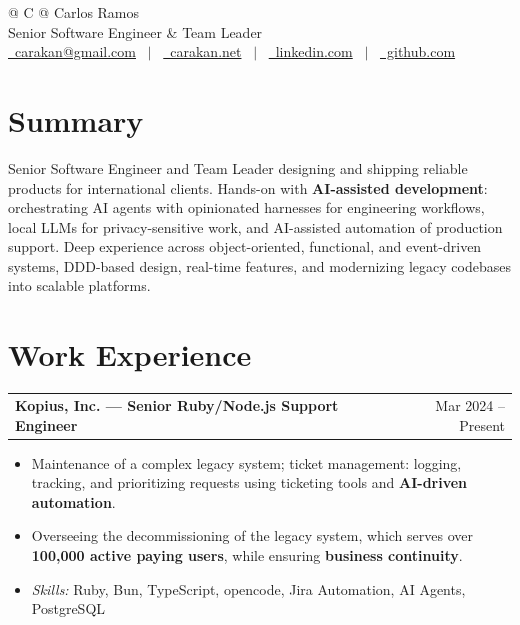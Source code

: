 \documentclass[a4paper,12pt]{article}
\makeatletter
\newcommand{\skillsfont}{\fontsize{9.6}{11.5}\selectfont}
\newenvironment{joblong}[2]
    {
    \begin{tabularx}{\linewidth}{@{}l X r@{}}
    \textbf{#1} & \hfill &  #2 \\[3.75pt]
    \end{tabularx}
    \begin{minipage}[t]{\linewidth}
    \begin{itemize}[nosep,after=\strut, leftmargin=1em, itemsep=3pt,label=--]
    }
    {
    \end{itemize}
    \end{minipage}
    }
\makeatother
\begin{document}
\pagestyle{empty}


\begin{tabularx}{\linewidth}{@{} C @{}}
\Huge{Carlos Ramos} \\[7.5pt]
\Large{Senior Software Engineer \& Team Leader} \\[7.5pt]
\href{mailto:carakan@gmail.com}{\raisebox{-0.05\height}\faEnvelope \ carakan@gmail.com} \ $|$ \
\href{https://carakan.net}{\raisebox{-0.05\height}\faGlobe \ carakan.net} \ $|$ \
\href{https://www.linkedin.com/in/carakan}{\raisebox{-0.05\height}\faLinkedin\ linkedin.com} \ $|$ \
\href{https://github.com/carakan}{\raisebox{-0.05\height}\faGithub\ github.com} \\
\end{tabularx}


\section{Summary}
Senior Software Engineer and Team Leader designing and shipping reliable
products for international clients. Hands-on with \textbf{AI-assisted
development}: orchestrating AI agents with opinionated harnesses for
engineering workflows, local LLMs for privacy-sensitive work, and AI-assisted
automation of production support.
Deep experience across object-oriented, functional, and event-driven systems,
DDD-based design, real-time features, and modernizing legacy codebases into
scalable platforms.

\section{Work Experience}

\begin{joblong}{Kopius, Inc. --- Senior Ruby/Node.js Support Engineer}{Mar 2024 -- Present}
\item Maintenance of a complex legacy system;
      ticket management: logging, tracking, and prioritizing requests using
      ticketing tools and \textbf{AI-driven automation}.
\item Overseeing the decommissioning of the legacy system, which serves over
      \textbf{100,000 active paying users}, while ensuring \textbf{business
      continuity}.
\par\vspace{6pt}\item[]\skillsfont\textit{Skills:} Ruby, Bun, TypeScript, opencode, Jira Automation, AI Agents, PostgreSQL
\end{joblong}
\end{document}
